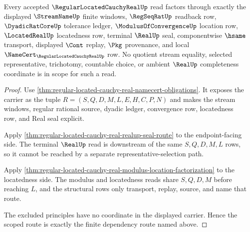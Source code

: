 \begin{theorem}
\label{thm:regular-located-cauchy-real-scoped-dependency-route}
Every accepted $\RegularLocatedCauchyRealUp$ read factors through exactly the displayed $\StreamNameUp$ finite windows, $\RegSeqRatUp$ readback row, $\DyadicRatCoreUp$ tolerance ledger, $\ModulusOfConvergenceUp$ location row, $\LocatedRealUp$ locatedness row, terminal $\RealUp$ seal, componentwise $\hsame$ transport, displayed $\Cont$ replay, $\Pkg$ provenance, and local $\NameCert_{\RegularLocatedCauchyRealUp}$ row. No quotient stream equality, selected representative, trichotomy, countable choice, or ambient $\RealUp$ completeness coordinate is in scope for such a read.
\end{theorem}
\begin{proof}
Use \autoref{thm:regular-located-cauchy-real-namecert-obligations}. It exposes the carrier as the tuple $R=(S,Q,D,M,L,E,H,C,P,N)$ and makes the stream windows, regular rational source, dyadic ledger, convergence row, locatedness row, and Real seal explicit.

Apply \autoref{thm:regular-located-cauchy-real-realup-seal-route} to the endpoint-facing side. The terminal $\RealUp$ read is downstream of the same $S,Q,D,M,L$ rows, so it cannot be reached by a separate representative-selection path.

Apply \autoref{thm:regular-located-cauchy-real-modulus-location-factorization} to the locatedness side. The modulus and locatedness reads share $S,Q,D,M$ before reaching $L$, and the structural rows only transport, replay, source, and name that route.

The excluded principles have no coordinate in the displayed carrier. Hence the scoped route is exactly the finite dependency route named above.
\end{proof}



